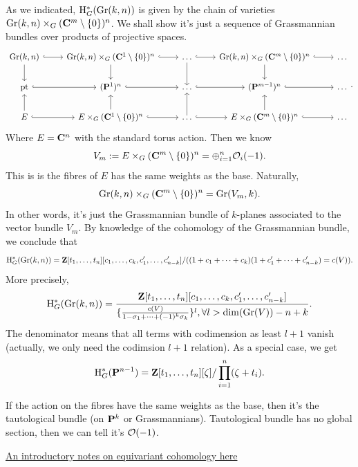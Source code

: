 \documentclass[../main.tex]{subfiles}
\begin{document}
\begin{example}[$G=(\C^{\times})^{n}, X=\Gr(k,n)$]
As we indicated, $\H^{*}_{G}(\Gr(k,n))$ is given by the chain of varieties $\Gr(k,n)\times_{G}(\C^{m}\setminus\{0\})^{n}$. We shall show it's just a sequence of Grassmannian bundles over products of projective spaces.
$$
\begin{tikzcd}
\Gr(k,n)\arrow{d} \arrow[hookrightarrow]{r} 
  & \Gr(k,n)\times_{G}(\C^{1}\setminus\{0\})^{n}\arrow[hookrightarrow]{r}\arrow{d} 
  & \dots \arrow[hookrightarrow]{r}\arrow{d} 
  & \Gr(k,n)\times_{G}(\C^{m}\setminus\{0\})^{n}\arrow[hookrightarrow]{r}\arrow{d}
  & \dots \\
\mathrm{pt} \arrow[hookrightarrow]{r} 
  & (\P^{1})^{n}\arrow[hookrightarrow]{r} 
  & \dots\arrow[hookrightarrow]{r}
  & (\P^{m-1})^{n}\arrow[hookrightarrow]{r}
  & \dots \\
E\arrow{u} \arrow[hookrightarrow]{r} 
  & E\times_{G}(\C^{1}\setminus\{0\})^{n}\arrow[hookrightarrow]{r}\arrow{u} 
  & \dots \arrow[hookrightarrow]{r}\arrow{u} 
  & E\times_{G}(\C^{m}\setminus\{0\})^{n}\arrow[hookrightarrow]{r}\arrow{u}
  & \dots
\end{tikzcd}.
$$
Where $E=\C^{n}$ with the standard torus action. Then we know
$$V_{m}:=E\times_{G}(\C^{m}\setminus\{0\})^{n}=\oplus_{i=1}^{n}\O_{i}(-1).$$
This is is the fibres of $E$ has the same weights as the base. Naturally,
$$\Gr(k,n)\times_{G}(\C^{m}\setminus\{0\})^{n}=\Gr(V_{m},k).$$
In other words, it's just the Grassmannian bundle of $k$-planes associated to the vector bundle $V_{m}$. By knowledge of the cohomology of the Grassmannian bundle, we conclude that 
$$\H^{*}_{G}(\Gr(k,n))=\Z[t_{1}, \dots, t_{n}][c_{1}, \dots, c_{k},c'_{1}, \dots, c'_{n-k}]/((1+c_{1}+\dots+c_{k})(1+c_{1}'+\dots+c_{n-k}')=c(V)).$$
More precisely,
$$\H^{*}_{G}(\Gr(k,n))=\frac{\Z[t_{1}, \dots, t_{n}][c_{1}, \dots, c_{k},c'_{1}, \dots, c'_{n-k}]}{\{\frac{c(V)}{1-\sigma_{1}+\dots+(-1)^{k}\sigma_{k}}\}^{l}, \forall l>\dim(\Gr(V))-n+k}.$$
The denominator means that all terms with codimension as least $l+1$ vanish (actually, we only need the codimsion $l+1$ relation). As a special case, we get 
$$\H^{*}_{G}(\P^{n-1})=\Z[t_{1}, \dots, t_{n}][\zeta]/\prod_{i=1}^{n}(\zeta+t_{i}).$$
\end{example}
\begin{remark}[$\O(-1)$ or $\O(1)$ ?]
If the action on the fibres have the same weights as the base, then it's the tautological bundle (on $\P^{k}$ or Grassmannians). Tautological bundle has no global section, then we can tell it's $\O(-1)$. 
\end{remark}
\begin{remark}
\href{https://www.impan.pl/~pragacz/anderson1.pdf}{An introductory notes on equivariant cohomology here}
\end{remark}
\end{document}
